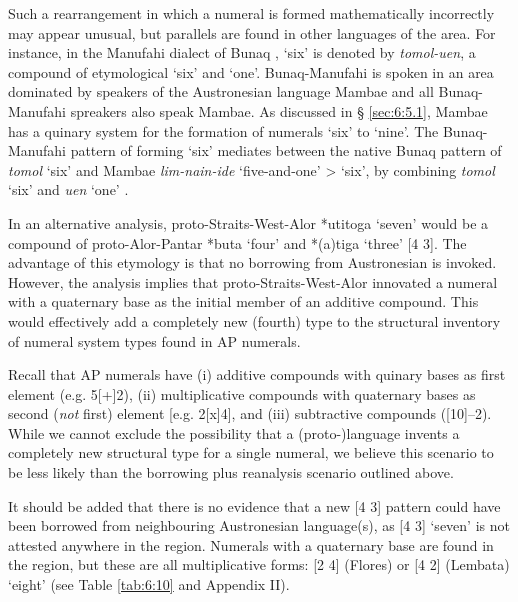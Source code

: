 Such a rearrangement in which a numeral is formed mathematically incorrectly may appear unusual, but parallels are found in other languages of the area. For instance, in the Manufahi dialect of Bunaq \citep[a language related to the Alor-Pantar languages spoken on Timor][]{Schapper2010}, `six' is denoted by \textit{tomol-uen}, a compound of etymological `six' and `one'. Bunaq-Manufahi is spoken in an area dominated by speakers of the Austronesian language Mambae and all Bunaq-Manufahi spreakers also speak Mambae. As discussed in {\S} \ref{sec:6:5.1}, Mambae has a quinary system for the formation of numerals `six' to `nine'. The Bunaq-Manufahi pattern of forming `six' mediates between the native Bunaq pattern of \textit{tomol} `six' and Mambae \textit{lim-nain-ide} `five-and-one' {\textgreater} `six', by combining \textit{tomol} `six' and \textit{uen} `one' .

In an alternative analysis, proto-Straits-West-Alor *{\texthtb}utitoga `seven' would be a compound of proto-Alor-Pantar *buta `four' and *(a)tiga `three' [4 3]. The advantage of this etymology is that no borrowing from Austronesian is invoked. However, the analysis implies that proto-Straits-West-Alor innovated a numeral with a quaternary base as the initial member of an additive compound. This would effectively add a completely new (fourth) type to the structural inventory of numeral system types found in AP numerals. 

Recall that AP numerals have (i) additive compounds with quinary bases as first element (e.g. 5[+]2), (ii) multiplicative compounds with quaternary bases as second (\textit{not} first) element [e.g. 2[x]4], and (iii) subtractive compounds ([10]--2). While we cannot exclude the possibility that a (proto-)language invents a completely new structural type for a single numeral, we believe this scenario to be less likely than the borrowing plus reanalysis scenario outlined above. 

It should be added that there is no evidence that a new [4 3] pattern could have been borrowed from neighbouring Austronesian language(s), as [4 3] `seven' is not attested anywhere in the region. Numerals with a quaternary base are found in the region, but these are all multiplicative forms: [2 4] (Flores) or [4 2] (Lembata) `eight' (see Table \ref{tab:6:10}  and Appendix II). 

